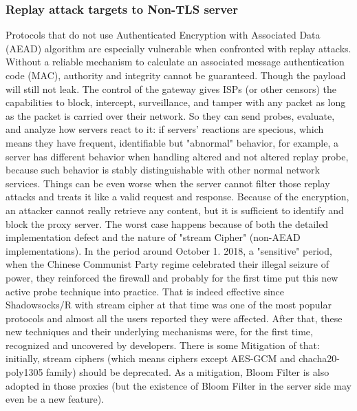 \documentclass[conference]{IEEEtran}
\begin{document}
\subsubsection{Replay attack targets to Non-TLS server}
Protocols that do not use Authenticated Encryption with Associated Data (AEAD) algorithm are especially vulnerable when confronted with replay attacks. Without a reliable mechanism to calculate an associated message authentication code (MAC), authority and integrity cannot be guaranteed. Though the payload will still not leak. 
The control of the gateway gives ISPs (or other censors) the capabilities to block, intercept, surveillance, and tamper with any packet as long as the packet is carried over their network. So they can send probes, evaluate, and analyze how servers react to it: if servers’ reactions are specious, which means they have frequent, identifiable but "abnormal" behavior, for example, a server has different behavior when handling altered and not altered replay probe, because such behavior is stably distinguishable with other normal network services. Things can be even worse when the server cannot filter those replay attacks and treats it like a valid request and response. Because of the encryption, an attacker cannot really retrieve any content, but it is sufficient to identify and block the proxy server\cite{Active_Probing}. The worst case happens because of both the detailed implementation defect and the nature of "stream Cipher" (non-AEAD implementations). 
In the period around October 1. 2018, a "sensitive" period, when the Chinese Communist Party regime celebrated their illegal seizure of power, they reinforced the firewall and probably for the first time put this new active probe technique into practice. That is indeed effective since Shadowsocks/R with stream cipher at that time was one of the most popular protocols and almost all the users reported they were affected. After that, these new techniques and their underlying mechanisms were, for the first time, recognized and uncovered by developers. 
There is some Mitigation of that: initially, stream ciphers (which means ciphers except AES-GCM and chacha20-poly1305 family) should be deprecated. As a mitigation, Bloom Filter is also adopted in those proxies (but the existence of Bloom Filter in the server side may even be a new feature).
\end{document}
